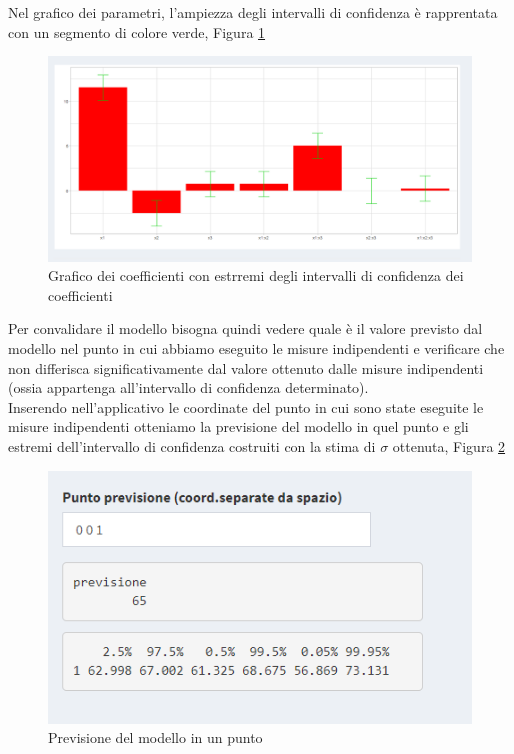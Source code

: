 \documentclass[
  11pt,
]{book}
\begin{document}
Nel grafico dei parametri, l'ampiezza degli intervalli di confidenza è
rapprentata con un segmento di colore verde, Figura \ref{fig:fc12}

\begin{figure}

{\centering \includegraphics[width=1\linewidth]{Immagini/Fatt_compl/12_intcong_graf} 

}

\caption{Grafico dei coefficienti con estrremi degli intervalli di confidenza dei coefficienti}\label{fig:fc12}
\end{figure}

Per convalidare il modello bisogna quindi vedere quale è il valore
previsto dal modello nel punto in cui abbiamo eseguito le misure
indipendenti e verificare che non differisca significativamente dal
valore ottenuto dalle misure indipendenti (ossia appartenga
all'intervallo di confidenza determinato).\\
Inserendo nell'applicativo le coordinate del punto in cui sono state
eseguite le misure indipendenti otteniamo la previsione del modello in
quel punto e gli estremi dell'intervallo di confidenza costruiti con la
stima di \(\sigma\) ottenuta, Figura \ref{fig:fc13}

\begin{figure}

{\centering \includegraphics[width=1\linewidth]{Immagini/Fatt_compl/13_prev} 

}

\caption{Previsione del modello in un punto}\label{fig:fc13}
\end{figure}
\end{document}
